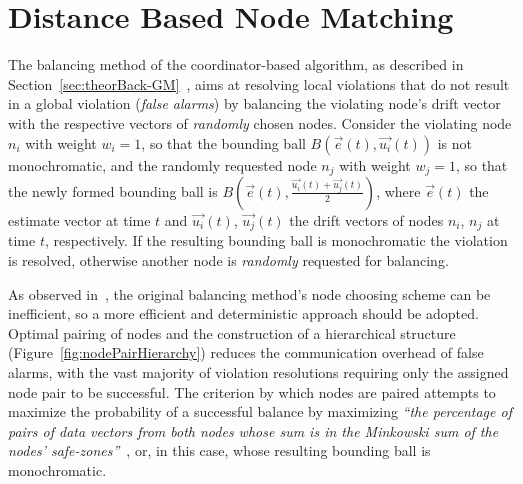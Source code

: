 \section{Distance Based Node Matching} \label{sec:impl-distNodeMatch}

The balancing method of the coordinator-based algorithm, as described in Section~\ref{sec:theorBack-GM}~\cite{Sharfman2006GM, Sharfman2012ShapeSensGM}, aims at resolving local violations that do not result in a global violation (\emph{false alarms}) by balancing the violating node's drift vector with the respective vectors of \emph{randomly} chosen nodes. Consider the violating node $n_i$ with weight $w_i=1$, so that the bounding ball $B(\vec{e}(t), \vec{u_i}(t))$ is not monochromatic, and the randomly requested node $n_j$ with weight $w_j=1$, so that the newly formed bounding ball is $B(\vec{e}(t), \frac{\vec{u_i}(t)+\vec{u_j}(t)}{2})$, where $\vec{e}(t)$ the estimate vector at time $t$ and $\vec{u_i}(t)$, $\vec{u_j}(t)$ the drift vectors of nodes $n_i$, $n_j$ at time $t$, respectively. If the resulting bounding ball is monochromatic the violation is resolved, otherwise another node is \emph{randomly} requested for balancing.

As observed in~\cite{Keren2014GMHetStreams, BenDavid2012ViolationRI}, the original balancing method's node choosing scheme can be inefficient, so a more efficient and deterministic approach should be adopted. Optimal pairing of nodes and the construction of a hierarchical structure (Figure~\ref{fig:nodePairHierarchy}) reduces the communication overhead of false alarms, with the vast majority of violation resolutions requiring only the assigned node pair to be successful. The criterion by which nodes are paired attempts to maximize the probability of a successful balance by maximizing \textit{``the percentage of pairs of data vectors from both nodes whose sum is in the Minkowski sum of the nodes' safe-zones''}~\cite{Keren2014GMHetStreams}, or, in this case, whose resulting bounding ball is monochromatic.

